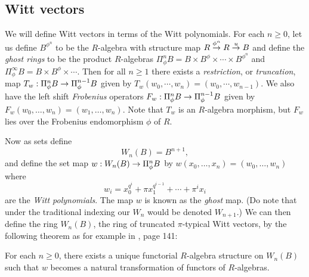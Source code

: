 \documentclass{amsart}
\numberwithin{equation}{section}
\begin{document}
\subsection{Witt vectors}
We will define Witt vectors in terms of the Witt polynomials.
For each $n \geq 0$, let us define $B^{\phi^n}$ to be the $R$-algebra
with structure map $R \stackrel{\phi^n} {\rightarrow} R \stackrel{u}{\rightarrow} B$ and define the \emph{ghost rings}
to be the product $R$-algebras
$\Pi^n_{\phi} B = B \times B^{\phi} \times \cdots  \times B^{\phi^n}$ and
$\Pi_{\phi}^\infty B= B \times B^{\phi} \times \cdots$.
Then for all $n \geq 1$ there exists a \emph{restriction}, or \emph{truncation},
map $T_w:\Pi_{\phi}^nB \rightarrow \Pi_{\phi}^{n-1}B$ given by $T_w(w_0,\cdots,w_n)= (w_0,\cdots,w_{n-1})$.
We also have the left shift \emph{Frobenius} operators $F_w:\Pi_{\phi}^n B \rightarrow \Pi_{\phi}^{n-1} B$ given by
$F_w(w_0,\dots,w_n) = (w_1,\dots,w_n)$. Note that $T_w$ is an $R$-algebra morphism, but
$F_w$ lies over the Frobenius endomorphism $\phi$ of $R$.

Now as sets define
        \begin{equation}
        \label{eq-witt-coord}
        W_n(B)=B^{n+1}, 
        \end{equation}
and define the set map $w:W_n(B) \rightarrow \Pi_{\phi}^n B$  by $w(x_0,\dots,x_n)= (w_0,\dots,w_n)$ where
        \begin{equation}
        \label{eq-witt-poly}
        w_i = x_0^{q^i}+ \pi x_1^{q^{i-1}}+ \cdots + \pi^i x_i
        \end{equation}
are the \emph{Witt polynomials}.
The map $w$ is known as the {\it ghost} map. (Do note that under the traditional indexing our $W_n$ would be
denoted $W_{n+1}$.) We can then define the ring $W_n(B)$, the ring
of truncated $\pi$-typical Witt vectors, by the following theorem as for 
example in \cite{MR3316757}, page 141:
\begin{theorem}
\label{wittdef}
For each $n \geq 0$, there exists a unique functorial $R$-algebra structure on $W_n(B)$ such that
$w$ becomes a natural transformation of functors of $R$-algebras.
\end{theorem}
\end{document}
